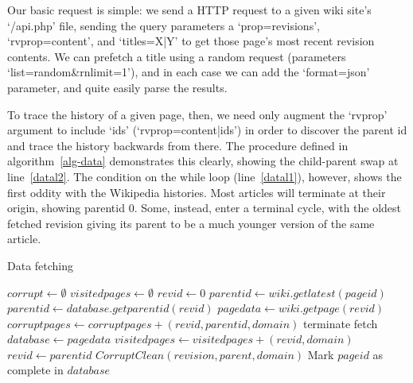 Our basic request is simple: we send a HTTP request to a given wiki
site's `/api.php' file, sending the query parameters a
`prop=revisions', `rvprop=content', and `titles=X|Y' to get those
page's most recent revision contents. We can prefetch a title using a
random request (parameters `list=random\&rnlimit=1'), and in each case
we can add the `format=json' parameter, and quite easily parse the
results. 

To trace the history of a given page, then, we need only augment the
`rvprop' argument to include `ids' (`rvprop=content|ids') in order to
discover the parent id and trace the history backwards from there. The
procedure defined in algorithm~\ref{alg-data} demonstrates this
clearly, showing the child-parent swap at line~\ref{datal2}. The
condition on the while loop (line~\ref{datal1}), however, shows the
first oddity with the Wikipedia histories. Most articles will
terminate at their origin, showing parentid 0. Some, instead, enter a
terminal cycle, with the oldest fetched revision giving its parent to
be a much younger version of the same article. 

\begin{algorithm}
  \caption{Data fetching}\label{alg-data}
  \begin{algorithmic}
    \State $corrupt \gets \emptyset$
    \State $visitedpages \gets \emptyset$
    \State $revid \gets 0$
    \State $parentid \gets wiki.getlatest(pageid)$
    \label{datal1} 
    \State $parentid \gets database.getparentid(revid)$
    \Else
    \State $pagedata \gets wiki.getpage(revid)$
    \EndIf
    \label{datal3}
    \State $corruptpages \gets corruptpages + (revid, parentid, domain)$
    \Else
    \State terminate fetch
    \EndIf
    \Else
    \State $database \gets page data$
    \EndIf
    \State $visitedpages \gets visitedpages + (revid, domain)$
    \State $revid \gets parentid$\label{datal2}
    \EndWhile
    \State $CorruptClean(revision, parent, domain)$
    \EndFor
    \State Mark $pageid$ as complete in $database$
    \EndProcedure
  \end{algorithmic}
\end{algorithm}


